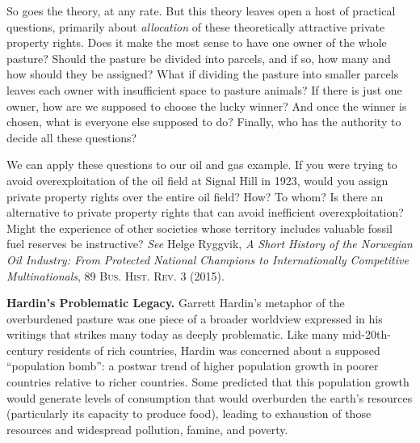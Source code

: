 So goes the theory, at any rate. But this theory leaves open a host of practical
questions, primarily about \textit{allocation} of these theoretically attractive
private property rights. Does it make the most sense to have one owner of the
whole pasture? Should the pasture be divided into parcels, and if so, how many
and how should they be assigned? What if dividing the pasture into smaller
parcels leaves each owner with insufficient space to pasture animals? If there
is just one owner, how are we supposed to choose the lucky winner? And once the
winner is chosen, what is everyone else supposed to do? Finally, who has the
authority to decide all these questions? 

We can apply these questions to our oil and gas example. If you were trying to
avoid overexploitation of the oil field at Signal Hill in 1923, would you assign
private property rights over the entire oil field? How? To whom? Is there an
alternative to private property rights that can avoid inefficient
overexploitation? Might the experience of other societies whose territory
includes valuable fossil fuel reserves be instructive? \textit{See} Helge
Ryggvik, \textit{A Short History of the Norwegian Oil Industry: From Protected
National Champions to Internationally Competitive Multinationals}, 89
\textsc{Bus. Hist. Rev.} 3 (2015).


\item \textbf{Hardin's Problematic Legacy.} Garrett Hardin's metaphor of the
overburdened pasture was one piece of a broader worldview expressed in his
writings that strikes many today as deeply problematic. Like many
mid-20th{}-century residents of rich countries, Hardin was concerned about a
supposed ``population bomb'': a postwar trend of higher population growth in
poorer countries relative to richer countries. Some predicted that this
population growth would generate levels of consumption that would overburden the
earth's resources (particularly its capacity to produce food), leading to
exhaustion of those resources and widespread pollution, famine, and poverty.

